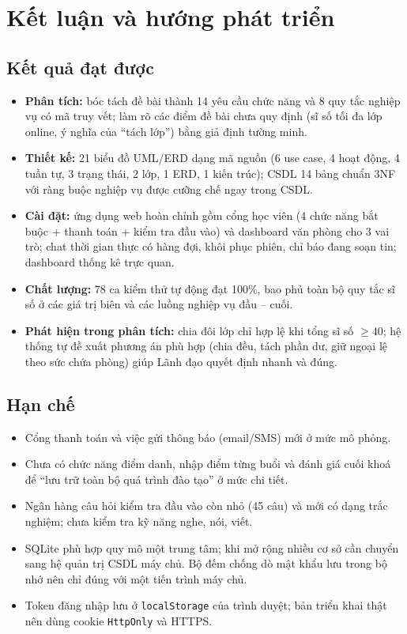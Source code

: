 \chapter{Kết luận và hướng phát triển}
\label{ch:conclusion}

\section{Kết quả đạt được}
\begin{itemize}
  \item \textbf{Phân tích:} bóc tách đề bài thành 14 yêu cầu chức năng và 8 quy tắc nghiệp vụ có mã truy vết; làm rõ các điểm đề bài chưa quy định (sĩ số tối đa lớp online, ý nghĩa của “tách lớp”) bằng giả định tường minh.
  \item \textbf{Thiết kế:} 21 biểu đồ UML/ERD dạng mã nguồn (6 use case, 4 hoạt động, 4 tuần tự, 3 trạng thái, 2 lớp, 1 ERD, 1 kiến trúc); CSDL 14 bảng chuẩn 3NF với ràng buộc nghiệp vụ được cưỡng chế ngay trong CSDL.
  \item \textbf{Cài đặt:} ứng dụng web hoàn chỉnh gồm cổng học viên (4 chức năng bắt buộc + thanh toán + kiểm tra đầu vào) và dashboard văn phòng cho 3 vai trò; chat thời gian thực có hàng đợi, khôi phục phiên, chỉ báo đang soạn tin; dashboard thống kê trực quan.
  \item \textbf{Chất lượng:} 78 ca kiểm thử tự động đạt 100\%, bao phủ toàn bộ quy tắc sĩ số ở các giá trị biên và các luồng nghiệp vụ đầu – cuối.
  \item \textbf{Phát hiện trong phân tích:} chia đôi lớp chỉ hợp lệ khi tổng sĩ số $\geq 40$; hệ thống tự đề xuất phương án phù hợp (chia đều, tách phần dư, giữ ngoại lệ theo sức chứa phòng) giúp Lãnh đạo quyết định nhanh và đúng.
\end{itemize}

\section{Hạn chế}
\begin{itemize}
  \item Cổng thanh toán và việc gửi thông báo (email/SMS) mới ở mức mô phỏng.
  \item Chưa có chức năng điểm danh, nhập điểm từng buổi và đánh giá cuối khoá để “lưu trữ toàn bộ quá trình đào tạo” ở mức chi tiết.
  \item Ngân hàng câu hỏi kiểm tra đầu vào còn nhỏ (45 câu) và mới có dạng trắc nghiệm; chưa kiểm tra kỹ năng nghe, nói, viết.
  \item SQLite phù hợp quy mô một trung tâm; khi mở rộng nhiều cơ sở cần chuyển sang hệ quản trị CSDL máy chủ. Bộ đếm chống dò mật khẩu lưu trong bộ nhớ nên chỉ đúng với một tiến trình máy chủ.
  \item Token đăng nhập lưu ở \texttt{localStorage} của trình duyệt; bản triển khai thật nên dùng cookie \texttt{HttpOnly} và HTTPS.
\end{itemize}

